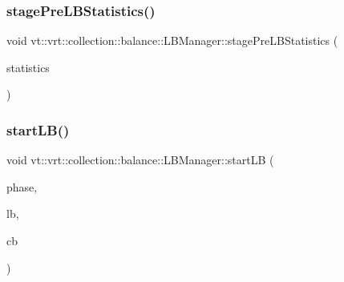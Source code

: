 \mbox{\label{structvt_1_1vrt_1_1collection_1_1balance_1_1_l_b_manager_a252f9c83adfffa64bbad75c4bf89fce3}} 
\subsubsection{\texorpdfstring{stage\+Pre\+L\+B\+Statistics()}{stagePreLBStatistics()}}
{\footnotesize\ttfamily void vt\+::vrt\+::collection\+::balance\+::\+L\+B\+Manager\+::stage\+Pre\+L\+B\+Statistics (\begin{DoxyParamCaption}\item[{const \hyperlink{structvt_1_1vrt_1_1collection_1_1balance_1_1_l_b_manager_a3c6941b9c14a77e015047c659b817a85}{Statistic\+Map\+Type} \&}]{statistics }\end{DoxyParamCaption})}

\mbox{\label{structvt_1_1vrt_1_1collection_1_1balance_1_1_l_b_manager_a9d93ed4b02b05ff1ed993ce2c6e92356}} 
\subsubsection{\texorpdfstring{start\+L\+B()}{startLB()}}
{\footnotesize\ttfamily void vt\+::vrt\+::collection\+::balance\+::\+L\+B\+Manager\+::start\+LB (\begin{DoxyParamCaption}\item[{\hyperlink{namespacevt_a46ce6733d5cdbd735d561b7b4029f6d7}{Phase\+Type}}]{phase,  }\item[{\hyperlink{namespacevt_1_1vrt_1_1collection_1_1balance_ac4f99693509affcc67db182d4aad9b5c}{L\+B\+Type}}]{lb,  }\item[{\hyperlink{namespacevt_a57b238783d05de96bc2c4027f7073b7f}{vt\+::\+Callback}$<$ \hyperlink{structvt_1_1vrt_1_1collection_1_1balance_1_1_reassignment_msg}{Reassignment\+Msg} $>$}]{cb }\end{DoxyParamCaption})}




